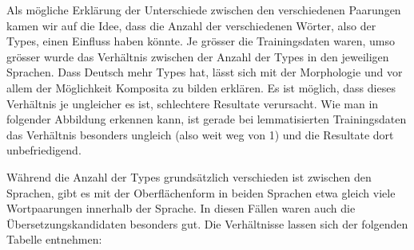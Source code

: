 \documentclass[11pt,twoside,openright]{mpreport}
\begin{document}
Als mögliche Erklärung der Unterschiede zwischen den verschiedenen Paarungen kamen wir auf die Idee, dass die Anzahl der verschiedenen Wörter, also der Types, einen Einfluss haben könnte. Je grösser die Trainingsdaten waren, umso grösser wurde das Verhältnis zwischen der Anzahl der Types in den jeweiligen Sprachen. Dass Deutsch mehr Types hat, lässt sich mit der Morphologie und vor allem der Möglichkeit Komposita zu bilden erklären. Es ist möglich, dass dieses Verhältnis je ungleicher es ist, schlechtere Resultate verursacht. Wie man in folgender
 Abbildung  erkennen kann, ist gerade bei lemmatisierten Trainingsdaten das 
Verhältnis besonders ungleich (also weit weg von 1) und die Resultate dort 
unbefriedigend.

\hspace{-6cm}

Während die Anzahl der Types grundsätzlich verschieden ist zwischen den Sprachen, gibt es mit der Oberflächenform in beiden Sprachen etwa gleich viele Wortpaarungen innerhalb der Sprache. In diesen Fällen waren auch die Übersetzungskandidaten besonders gut. Die Verhältnisse lassen sich der folgenden Tabelle entnehmen:
\end{document}
